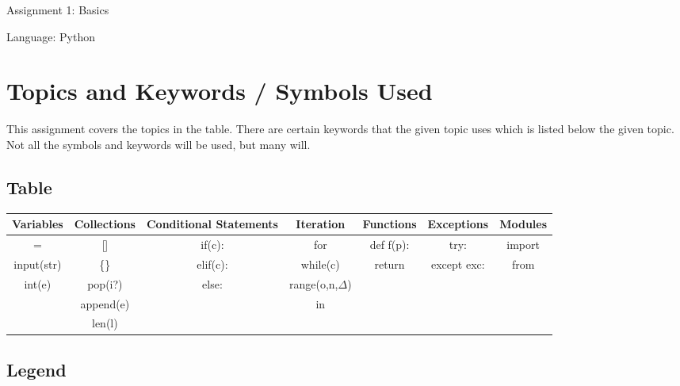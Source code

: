 \documentclass[12pt]{report}
\begin{document}
\begin{titlepage}
    \begin{center}
\vspace*{9cm}
  \begin{LARGE}
        Assignment 1: Basics    
    \end{LARGE}

    \vspace*{0.5cm}
    
    \begin{Large}
        Language: Python
    \end{Large}

    \vspace*{0.5cm}
\end{center}
\end{titlepage}
\section*{Topics and Keywords / Symbols Used}

This assignment covers the topics in the table. 
There are certain keywords that the given topic uses which is listed below the given topic. 
Not all the symbols and keywords will be used, but many will.


\subsection*{Table}

\begin{tabular}{ | c | c | c | c | c | c | c |}
    \hline
    Variables & Collections & Conditional Statements & Iteration & Functions & Exceptions & Modules \\
    \hline
    \noalign{\smallskip}\noalign{\smallskip}\noalign{\smallskip}\noalign{\smallskip}
    \hline
    = & [] & if(c): & for & def f(p):& try: & import \\
    \hline
    input(str) & \{\} & elif(c): & while(c) & return & except exc: & from \\
    \hline
    int(e) & pop(i?) & else: & range(o,n,${\Delta}$) &&& \\
    \hline
    & append(e) && in &&&\\ 
    \hline
    & len(l) &&&&& \\
    \hline

\end{tabular}

\subsection*{Legend}
\end{document}

